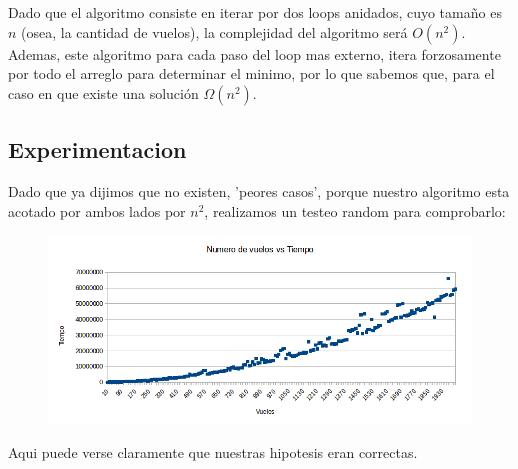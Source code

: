 Dado que el algoritmo consiste en iterar por dos loops anidados, cuyo tamaño es $n$ (osea, la cantidad de vuelos), la complejidad del algoritmo será $O(n^2)$.
\\
Ademas, este algoritmo para cada paso del loop mas externo, itera forzosamente por todo el arreglo para determinar el minimo, por lo que sabemos que, para el caso en que existe una solución $\Omega (n^2)$.

\newpage

\subsection{Experimentacion}

Dado que ya dijimos que no existen, 'peores casos', porque nuestro algoritmo esta acotado por ambos lados por $n^2$, realizamos un testeo random para comprobarlo:

\begin{figure}[h!]
  \begin{center}
	\includegraphics[scale=0.5]{Ej1/testingnvst.png}
	\label{nombreparareferenciar}
  \end{center}
\end{figure}

Aqui puede verse claramente que nuestras hipotesis eran correctas.